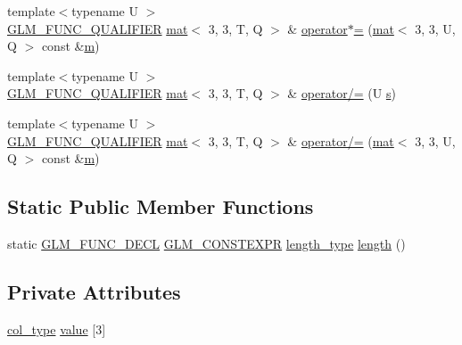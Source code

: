 \begin{DoxyCompactItemize}
\item 
{\footnotesize template$<$typename U $>$ }\\\mbox{\hyperlink{setup_8hpp_a33fdea6f91c5f834105f7415e2a64407}{G\+L\+M\+\_\+\+F\+U\+N\+C\+\_\+\+Q\+U\+A\+L\+I\+F\+I\+ER}} \mbox{\hyperlink{structglm_1_1mat}{mat}}$<$ 3, 3, T, Q $>$ \& \mbox{\hyperlink{structglm_1_1mat_3_013_00_013_00_01_t_00_01_q_01_4_a7c00c95a88f92ef9bf08db8a921c6e83}{operator$\ast$=}} (\mbox{\hyperlink{structglm_1_1mat}{mat}}$<$ 3, 3, U, Q $>$ const \&\mbox{\hyperlink{_s_d_l__opengl__glext_8h_af593500c283bf1a787a6f947f503a5c2}{m}})
\item 
{\footnotesize template$<$typename U $>$ }\\\mbox{\hyperlink{setup_8hpp_a33fdea6f91c5f834105f7415e2a64407}{G\+L\+M\+\_\+\+F\+U\+N\+C\+\_\+\+Q\+U\+A\+L\+I\+F\+I\+ER}} \mbox{\hyperlink{structglm_1_1mat}{mat}}$<$ 3, 3, T, Q $>$ \& \mbox{\hyperlink{structglm_1_1mat_3_013_00_013_00_01_t_00_01_q_01_4_a01c97ce833185af46bbdb1ab5f4cb9a9}{operator/=}} (U \mbox{\hyperlink{_s_d_l__opengl_8h_a4af680a6c683f88ed67b76f207f2e6e4}{s}})
\item 
{\footnotesize template$<$typename U $>$ }\\\mbox{\hyperlink{setup_8hpp_a33fdea6f91c5f834105f7415e2a64407}{G\+L\+M\+\_\+\+F\+U\+N\+C\+\_\+\+Q\+U\+A\+L\+I\+F\+I\+ER}} \mbox{\hyperlink{structglm_1_1mat}{mat}}$<$ 3, 3, T, Q $>$ \& \mbox{\hyperlink{structglm_1_1mat_3_013_00_013_00_01_t_00_01_q_01_4_a9fea79c2d1b00d77863a64dad3ddb1af}{operator/=}} (\mbox{\hyperlink{structglm_1_1mat}{mat}}$<$ 3, 3, U, Q $>$ const \&\mbox{\hyperlink{_s_d_l__opengl__glext_8h_af593500c283bf1a787a6f947f503a5c2}{m}})
\end{DoxyCompactItemize}
\subsection*{Static Public Member Functions}
\begin{DoxyCompactItemize}
\item 
static \mbox{\hyperlink{setup_8hpp_ab2d052de21a70539923e9bcbf6e83a51}{G\+L\+M\+\_\+\+F\+U\+N\+C\+\_\+\+D\+E\+CL}} \mbox{\hyperlink{setup_8hpp_a08b807947b47031d3a511f03f89645ad}{G\+L\+M\+\_\+\+C\+O\+N\+S\+T\+E\+X\+PR}} \mbox{\hyperlink{structglm_1_1mat_3_013_00_013_00_01_t_00_01_q_01_4_ae1b8524f20936516a48384a2841b5b9d}{length\+\_\+type}} \mbox{\hyperlink{structglm_1_1mat_3_013_00_013_00_01_t_00_01_q_01_4_aa0e0966b5046ab9a88536683a901c589}{length}} ()
\end{DoxyCompactItemize}
\subsection*{Private Attributes}
\begin{DoxyCompactItemize}
\item 
\mbox{\hyperlink{structglm_1_1mat_3_013_00_013_00_01_t_00_01_q_01_4_a4d84bef3685131dbb0ac43cac0a3b147}{col\+\_\+type}} \mbox{\hyperlink{structglm_1_1mat_3_013_00_013_00_01_t_00_01_q_01_4_a505193d8cb434f9d92dafb3108e39452}{value}} \mbox{[}3\mbox{]}
\end{DoxyCompactItemize}


